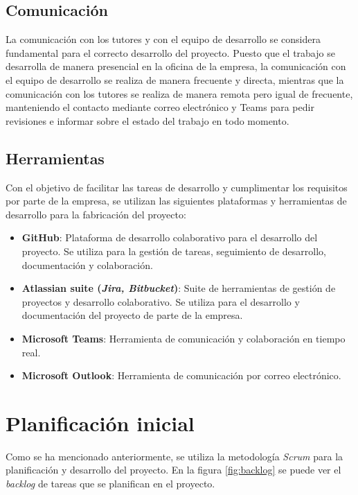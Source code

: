 \subsection{Comunicación}\label{subsec:comunicación}
La comunicación con los tutores y con el equipo de desarrollo se considera
fundamental para el correcto desarrollo del proyecto. Puesto que el trabajo se
desarrolla de manera presencial en la oficina de la empresa, la comunicación con
el equipo de desarrollo se realiza de manera frecuente y directa, mientras que
la comunicación con los tutores se realiza de manera remota pero igual de
frecuente, manteniendo el contacto mediante correo electrónico y Teams para
pedir revisiones e informar sobre el estado del trabajo en todo momento.


\subsection{Herramientas}\label{subsec:herr_planif}
Con el objetivo de facilitar las tareas de desarrollo y cumplimentar los
requisitos por parte de la empresa, se utilizan las siguientes plataformas y
herramientas de desarrollo para la fabricación del proyecto:

\begin{itemize}
	\item \textbf{GitHub}: Plataforma de desarrollo colaborativo para el
		desarrollo del proyecto. Se utiliza para la gestión de tareas,
		seguimiento de desarrollo, documentación y colaboración.
	\item \textbf{Atlassian suite (\emph{Jira, Bitbucket})}: Suite de
		herramientas de gestión de proyectos y desarrollo colaborativo. Se
		utiliza para el desarrollo y documentación del proyecto de parte de la
		empresa.
	\item \textbf{Microsoft Teams}: Herramienta de comunicación y colaboración
		en tiempo real.
	\item \textbf{Microsoft Outlook}: Herramienta de comunicación por correo
		electrónico.
\end{itemize}


\newpage{}
\section{Planificación inicial}\label{sec:planif_inicial}
Como se ha mencionado anteriormente, se utiliza la metodología \textit{Scrum}
para la planificación y desarrollo del proyecto. En la figura \ref{fig:backlog}
se puede ver el \textit{backlog} de tareas que se planifican en el proyecto.

